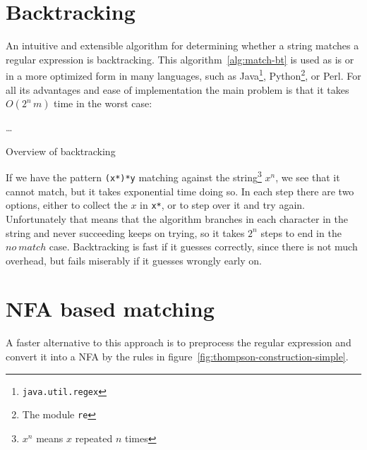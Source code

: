 \documentclass[11pt,a4paper,twoside,openright]{Thesis}
\theoremstyle{definition}
\newcommand{\Figref}[1]{figure~\ref{fig:#1}}
\newcommand{\seclabel}[1]{\label{sec:#1}}
\begin{document}
\section{Backtracking}\seclabel{backtracking}
An intuitive and extensible algorithm for determining whether a string 
matches a regular expression is backtracking. This 
algorithm~\ref{alg:match-bt} is used as is or in a more optimized form in 
many languages, such as Java\footnote{\texttt{java.util.regex}}, 
Python\footnote{The module \texttt{re}}, or Perl\cite{Cox07a}. For all its 
advantages and ease of implementation the main problem is that it takes 
$O(2^n\,m)$ time in the worst case:

\begin{algorithm*}
  \begin{algorithmic}
      \State {}
      \State {}
        \State {}
      \Else
        \State {}
      \EndIf
    \ElsIf{\dots}
      \State \dots
    \EndIf
  \EndFunction
  \end{algorithmic}
  \caption{\label{alg:match-bt}Overview of backtracking}
\end{algorithm*}

If we have the pattern \texttt{(x*)*y} matching against the
string\footnote{$x^n$ means $x$ repeated $n$ times} $x^n$, we see that it
cannot match, but it takes exponential time doing so. In each step there
are two options, either to collect the $x$ in \texttt{x*}, or to step over it
and try again. Unfortunately that means that the algorithm branches in each
character in the string and never succeeding keeps on trying, so it takes $2^n$
steps to end in the $no\ match$ case.  Backtracking is fast if it guesses
correctly, since there is not much overhead, but fails miserably if it guesses
wrongly early on.

\section{NFA based matching}\label{sec:nfa-match}
A faster alternative to this approach is to preprocess the regular expression 
and convert it into a NFA by the rules in \Figref{thompson-construction-simple}.
\end{document}
